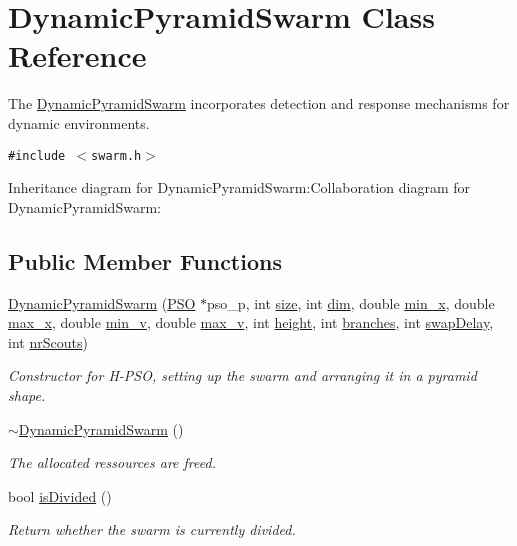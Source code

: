 \hypertarget{classDynamicPyramidSwarm}{
\section{DynamicPyramidSwarm Class Reference}
\label{classDynamicPyramidSwarm}
}
The \hyperlink{classDynamicPyramidSwarm}{DynamicPyramidSwarm} incorporates detection and response mechanisms for dynamic environments.  


{\tt \#include $<$swarm.h$>$}

Inheritance diagram for DynamicPyramidSwarm:Collaboration diagram for DynamicPyramidSwarm:\subsection*{Public Member Functions}
\begin{CompactItemize}
\item 
\hyperlink{classDynamicPyramidSwarm_53de8f13494e7080a5535a17baa2ae71}{DynamicPyramidSwarm} (\hyperlink{classPSO}{PSO} $\ast$pso\_\-p, int \hyperlink{runpso_8cpp_439227feff9d7f55384e8780cfc2eb82}{size}, int \hyperlink{runpso_8cpp_70b5e28b5bc3d1b63a7435c5fe50b837}{dim}, double \hyperlink{classSwarm_b504e23c39413573e3685a88435f5f85}{min\_\-x}, double \hyperlink{classSwarm_e5075d21be96c1cdf441bc2b612177c1}{max\_\-x}, double \hyperlink{classSwarm_160c79397ea811636e17c0e4d6297729}{min\_\-v}, double \hyperlink{classSwarm_2b0dbde2c275f991580a07a745cb5ade}{max\_\-v}, int \hyperlink{classPyramidSwarm_147496f1f506ee3f2e82cadc9c235baf}{height}, int \hyperlink{classPyramidSwarm_b60c66cd8c7437c9b9abb2016a65e824}{branches}, int \hyperlink{classPyramidSwarm_b45f85f201faea37d41695fe4d3cae04}{swapDelay}, int \hyperlink{classSwarm_6ec8b4463d83af484788490c203ae166}{nrScouts})
\begin{CompactList}\small\item\em Constructor for H-PSO, setting up the swarm and arranging it in a pyramid shape. \item\end{CompactList}\item 
\hyperlink{classDynamicPyramidSwarm_d8b5d895a18016eccfdac566d9281bc6}{$\sim$DynamicPyramidSwarm} ()
\begin{CompactList}\small\item\em The allocated ressources are freed. \item\end{CompactList}\item 
bool \hyperlink{classDynamicPyramidSwarm_65efd123a0e770211a47fd384c36af12}{isDivided} ()
\begin{CompactList}\small\item\em Return whether the swarm is currently divided. \item\end{CompactList}\end{CompactItemize}
